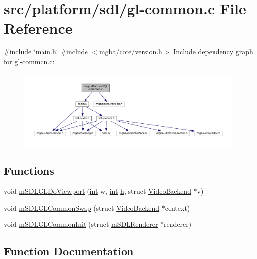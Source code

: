 \hypertarget{gl-common_8c}{}\section{src/platform/sdl/gl-\/common.c File Reference}
\label{gl-common_8c}
{\ttfamily \#include \char`\"{}main.\+h\char`\"{}}\newline
{\ttfamily \#include $<$mgba/core/version.\+h$>$}\newline
Include dependency graph for gl-\/common.c\+:
\nopagebreak
\begin{figure}[H]
\begin{center}
\leavevmode
\includegraphics[width=350pt]{gl-common_8c__incl}
\end{center}
\end{figure}
\subsection*{Functions}
\begin{DoxyCompactItemize}
\item 
void \mbox{\hyperlink{gl-common_8c_a3bdc1ec0c721ec01a7acf856d6370dd3}{m\+S\+D\+L\+G\+L\+Do\+Viewport}} (\mbox{\hyperlink{ioapi_8h_a787fa3cf048117ba7123753c1e74fcd6}{int}} w, \mbox{\hyperlink{ioapi_8h_a787fa3cf048117ba7123753c1e74fcd6}{int}} \mbox{\hyperlink{isa-lr35902_8c_a06a62682361411df32cf88f75a0b8da4}{h}}, struct \mbox{\hyperlink{struct_video_backend}{Video\+Backend}} $\ast$v)
\item 
void \mbox{\hyperlink{gl-common_8c_ae4d176ceb2ea06fadb56334f1022586e}{m\+S\+D\+L\+G\+L\+Common\+Swap}} (struct \mbox{\hyperlink{struct_video_backend}{Video\+Backend}} $\ast$context)
\item 
void \mbox{\hyperlink{gl-common_8c_a0e50f5587724b819f700b4e7efcec813}{m\+S\+D\+L\+G\+L\+Common\+Init}} (struct \mbox{\hyperlink{structm_s_d_l_renderer}{m\+S\+D\+L\+Renderer}} $\ast$renderer)
\end{DoxyCompactItemize}


\subsection{Function Documentation}
\mbox{\label{gl-common_8c_a0e50f5587724b819f700b4e7efcec813}} 
